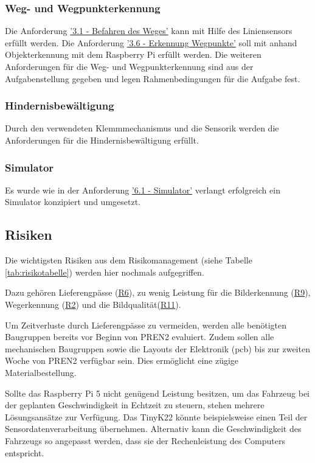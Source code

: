 \documentclass[../main.tex]{subfiles}
\begin{document}
\subsubsection{Weg- und Wegpunkterkennung}

Die Anforderung \hyperlink{A3.1}{'3.1 - Befahren des Weges'} kann mit Hilfe des Liniensensors erfüllt werden. Die Anforderung \hyperlink{A3.6}{'3.6 - Erkennung Wegpunkte'} soll mit anhand Objekterkennung mit dem Raspberry Pi erfüllt werden. Die weiteren Anforderungen für die Weg- und Wegpunkterkennung sind aus der Aufgabenstellung gegeben und legen Rahmenbedingungen für die Aufgabe fest.

\subsubsection{Hindernisbewältigung}

Durch den verwendeten Klemmmechanismus und die Sensorik werden die Anforderungen für die Hindernisbewältigung erfüllt.

\subsubsection{Simulator}

Es wurde wie in der Anforderung \hyperlink{A6.1}{'6.1 - Simulator'} verlangt erfolgreich ein Simulator konzipiert und umgesetzt.

\newpage
\subsection{Risiken}
Die wichtigsten Risiken aus dem Risikomanagement (siehe Tabelle \ref{tab:risikotabelle}) werden hier nochmals aufgegriffen.

Dazu gehören Lieferengpässe (\hyperlink{R6}{R6}), zu wenig Leistung für die Bilderkennung (\hyperlink{R9}{R9}), Wegerkennung (\hyperlink{R2}{R2}) und die Bildqualität(\hyperlink{R11}{R11}). 

Um Zeitverluste durch Lieferengpässe zu vermeiden, werden alle benötigten Baugruppen bereits vor Beginn von PREN2 evaluiert. Zudem sollen alle mechanischen Baugruppen sowie die Layouts der Elektronik (\acrshort{pcb}) bis zur zweiten Woche von PREN2 verfügbar sein. Dies ermöglicht eine zügige Materialbestellung.

Sollte das Raspberry Pi 5 nicht genügend Leistung besitzen, um das Fahrzeug bei der geplanten Geschwindigkeit in Echtzeit zu steuern, stehen mehrere Lösungsansätze zur Verfügung. Das TinyK22 könnte beispielsweise einen Teil der Sensordatenverarbeitung übernehmen. Alternativ kann die Geschwindigkeit des Fahrzeugs so angepasst werden, dass sie der Rechenleistung des Computers entspricht.
\end{document}
